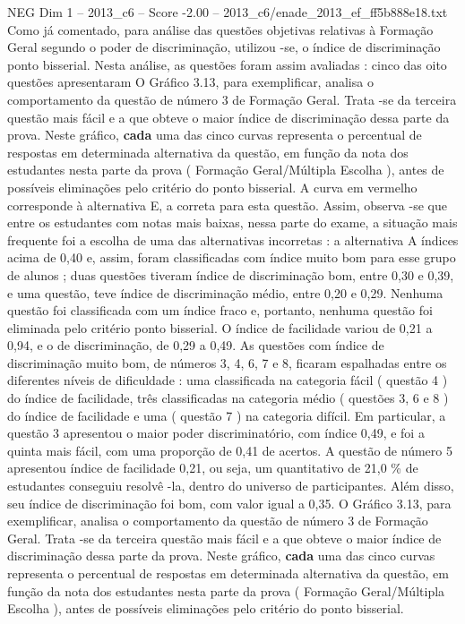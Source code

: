 \begin{textsample}{NEG Dim 1 – 2013\_c6 – Score -2.00 – 2013\_c6/enade\_2013\_ef\_ff5b888e18.txt}
Como já comentado, para análise das questões objetivas relativas à Formação Geral segundo o poder de discriminação, utilizou -se, o índice de discriminação ponto bisserial.
Nesta análise, as questões foram assim avaliadas : cinco das oito questões apresentaram O Gráfico 3.13, para exemplificar, analisa o comportamento da questão de número 3 de Formação Geral.
Trata -se da terceira questão mais fácil e a que obteve o maior índice de discriminação dessa parte da prova.
Neste gráfico, \textbf{cada} uma das cinco curvas representa o percentual de respostas em determinada alternativa da questão, em função da nota dos estudantes nesta parte da prova ( Formação Geral/Múltipla Escolha ), antes de possíveis eliminações pelo critério do ponto bisserial.
A curva em vermelho corresponde à alternativa E, a correta para esta questão.
Assim, observa -se que entre os estudantes com notas mais baixas, nessa parte do exame, a situação mais frequente foi a escolha de uma das alternativas incorretas : a alternativa A índices acima de 0,40 e, assim, foram classificadas com índice muito bom para esse grupo de alunos ; duas questões tiveram índice de discriminação bom, entre 0,30 e 0,39, e uma questão, teve índice de discriminação médio, entre 0,20 e 0,29.
Nenhuma questão foi classificada com um índice fraco e, portanto, nenhuma questão foi eliminada pelo critério ponto bisserial.
O índice de facilidade variou de 0,21 a 0,94, e o de discriminação, de 0,29 a 0,49.
As questões com índice de discriminação muito bom, de números 3, 4, 6, 7 e 8, ficaram espalhadas entre os diferentes níveis de dificuldade : uma classificada na categoria fácil ( questão 4 ) do índice de facilidade, três classificadas na categoria médio ( questões 3, 6 e 8 ) do índice de facilidade e uma ( questão 7 ) na categoria difícil.
Em particular, a questão 3 apresentou o maior poder discriminatório, com índice 0,49, e foi a quinta mais fácil, com uma proporção de 0,41 de acertos.
A questão de número 5 apresentou índice de facilidade 0,21, ou seja, um quantitativo de 21,0 \% de estudantes conseguiu resolvê -la, dentro do universo de participantes.
Além disso, seu índice de discriminação foi bom, com valor igual a 0,35.
O Gráfico 3.13, para exemplificar, analisa o comportamento da questão de número 3 de Formação Geral.
Trata -se da terceira questão mais fácil e a que obteve o maior índice de discriminação dessa parte da prova.
Neste gráfico, \textbf{cada} uma das cinco curvas representa o percentual de respostas em determinada alternativa da questão, em função da nota dos estudantes nesta parte da prova ( Formação Geral/Múltipla Escolha ), antes de possíveis eliminações pelo critério do ponto bisserial.

\end{textsample}
